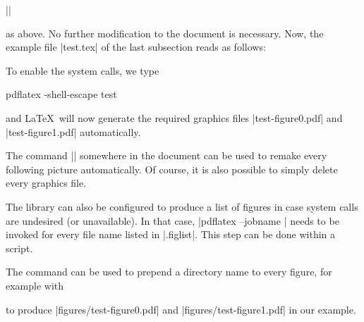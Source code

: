\begin{pgfgraphicnamed}
|\tikzexternalize|

\noindent as above. No further modification to the document is necessary. Now, the example file |test.tex| of the last subsection reads as follows:
\noindent To enable the system calls, we type
\begin{codeexample}
pdflatex -shell-escape test
\end{codeexample}
\noindent and \LaTeX\ will now generate the required graphics files |test-figure0.pdf| and |test-figure1.pdf| automatically.

The command |\tikzset{external/force remake}| somewhere in the document can be used to remake every following picture automatically. Of course, it is also possible to simply delete every graphics file.

The library can also be configured to produce a list of figures in case system calls are undesired (or unavailable). In that case, |pdflatex --jobname | needs to be invoked for every file name listed in |.figlist|. This step can be done within a script.

The command  can be used to prepend a directory name to every figure, for example with
\begin{codeexample}
\end{codeexample}
\noindent to produce |figures/test-figure0.pdf| and |figures/test-figure1.pdf| in our example.


\end{pgfgraphicnamed}
